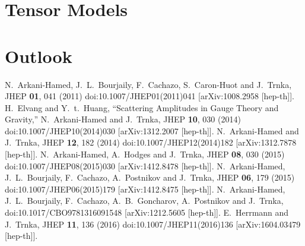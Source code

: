 \documentclass[letter,12pt]{article}
\begin{document}
\section{Tensor Models}
\section{Outlook}
\newpage
\begin{thebibliography}{99}
N.~Arkani-Hamed, J.~L.~Bourjaily, F.~Cachazo, S.~Caron-Huot and J.~Trnka,
JHEP \textbf{01}, 041 (2011)
doi:10.1007/JHEP01(2011)041
[arXiv:1008.2958 [hep-th]].
H.~Elvang and Y.~t.~Huang,
``Scattering Amplitudes in Gauge Theory and Gravity,''
N.~Arkani-Hamed and J.~Trnka,
JHEP \textbf{10}, 030 (2014)
doi:10.1007/JHEP10(2014)030
[arXiv:1312.2007 [hep-th]].
N.~Arkani-Hamed and J.~Trnka,
JHEP \textbf{12}, 182 (2014)
doi:10.1007/JHEP12(2014)182
[arXiv:1312.7878 [hep-th]].
N.~Arkani-Hamed, A.~Hodges and J.~Trnka,
JHEP \textbf{08}, 030 (2015)
doi:10.1007/JHEP08(2015)030
[arXiv:1412.8478 [hep-th]].
N.~Arkani-Hamed, J.~L.~Bourjaily, F.~Cachazo, A.~Postnikov and J.~Trnka,
JHEP \textbf{06}, 179 (2015)
doi:10.1007/JHEP06(2015)179
[arXiv:1412.8475 [hep-th]].
N.~Arkani-Hamed, J.~L.~Bourjaily, F.~Cachazo, A.~B.~Goncharov, A.~Postnikov and J.~Trnka,
doi:10.1017/CBO9781316091548
[arXiv:1212.5605 [hep-th]].
E.~Herrmann and J.~Trnka,
JHEP \textbf{11}, 136 (2016)
doi:10.1007/JHEP11(2016)136
[arXiv:1604.03479 [hep-th]].
\end{thebibliography}
\end{document}

